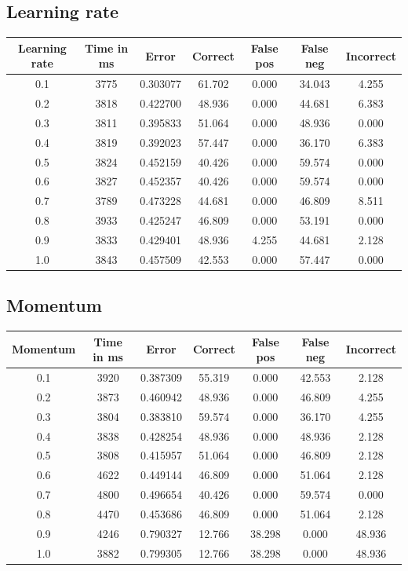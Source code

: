 \documentclass[12pt,a4,notitlepage]{report}
\renewcommand{\_}{\texttt{\symbol{95}}}
\newcommand{\<}{\texttt{\symbol{60}}}
\renewcommand{\>}{\texttt{\symbol{62}}}
\begin{document}
\subsection{Learning rate}

\begin{tabular}{c|cccccc}
Learning rate & Time in ms & Error & Correct & False pos & False neg & Incorrect \\ \hline
0.1 & 3775 & 0.303077 & 61.702 & 0.000 & 34.043 & 4.255 \\
0.2 & 3818 & 0.422700 & 48.936 & 0.000 & 44.681 & 6.383 \\
0.3 & 3811 & 0.395833 & 51.064 & 0.000 & 48.936 & 0.000 \\
0.4 & 3819 & 0.392023 & 57.447 & 0.000 & 36.170 & 6.383 \\
0.5 & 3824 & 0.452159 & 40.426 & 0.000 & 59.574 & 0.000 \\
0.6 & 3827 & 0.452357 & 40.426 & 0.000 & 59.574 & 0.000 \\
0.7 & 3789 & 0.473228 & 44.681 & 0.000 & 46.809 & 8.511 \\
0.8 & 3933 & 0.425247 & 46.809 & 0.000 & 53.191 & 0.000 \\
0.9 & 3833 & 0.429401 & 48.936 & 4.255 & 44.681 & 2.128 \\
1.0 & 3843 & 0.457509 & 42.553 & 0.000 & 57.447 & 0.000 \\
\end{tabular}

\subsection{Momentum}

\begin{tabular}{c|cccccc}
Momentum & Time in ms & Error & Correct & False pos & False neg & Incorrect \\ \hline
0.1 & 3920 & 0.387309 & 55.319 & 0.000 & 42.553 & 2.128  \\
0.2 & 3873 & 0.460942 & 48.936 & 0.000 & 46.809 & 4.255  \\
0.3 & 3804 & 0.383810 & 59.574 & 0.000 & 36.170 & 4.255  \\
0.4 & 3838 & 0.428254 & 48.936 & 0.000 & 48.936 & 2.128  \\
0.5 & 3808 & 0.415957 & 51.064 & 0.000 & 46.809 & 2.128  \\
0.6 & 4622 & 0.449144 & 46.809 & 0.000 & 51.064 & 2.128  \\
0.7 & 4800 & 0.496654 & 40.426 & 0.000 & 59.574 & 0.000  \\
0.8 & 4470 & 0.453686 & 46.809 & 0.000 & 51.064 & 2.128  \\
0.9 & 4246 & 0.790327 & 12.766 & 38.298 & 0.000 & 48.936  \\
1.0 & 3882 & 0.799305 & 12.766 & 38.298 & 0.000 & 48.936  \\
\end{tabular}
\end{document}
